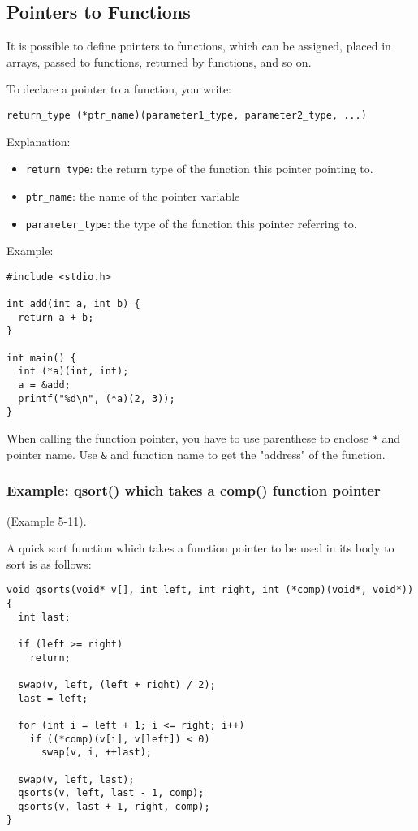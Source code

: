 \documentclass[12pt]{article}
\begin{document}
\subsection{Pointers to Functions}
\label{sec:org058e47b}
It is possible to define pointers to functions, which can be assigned, placed in arrays, passed to functions, returned by functions, and so on.

To declare a pointer to a function, you write:
\begin{verbatim}
return_type (*ptr_name)(parameter1_type, parameter2_type, ...)
\end{verbatim}
Explanation:
\begin{itemize}
\item \texttt{return\_type}: the return type of the function this pointer pointing to.
\item \texttt{ptr\_name}: the name of the pointer variable
\item \texttt{parameter\_type}: the type of the function this pointer referring to.
\end{itemize}

Example:
\begin{verbatim}
#include <stdio.h>

int add(int a, int b) {
  return a + b;
}

int main() {
  int (*a)(int, int);
  a = &add;
  printf("%d\n", (*a)(2, 3));
}
\end{verbatim}
When calling the function pointer, you have to use parenthese to enclose \texttt{*} and pointer name. Use \texttt{\&} and function name to get the "address" of the function.

\subsubsection{Example: qsort() which takes a comp() function pointer}
\label{sec:org483b263}
(Example 5-11).

A quick sort function which takes a function pointer to be used in its body to sort is as follows:
\begin{verbatim}
void qsorts(void* v[], int left, int right, int (*comp)(void*, void*)) {
  int last;

  if (left >= right)
    return;

  swap(v, left, (left + right) / 2);
  last = left;

  for (int i = left + 1; i <= right; i++)
    if ((*comp)(v[i], v[left]) < 0)
      swap(v, i, ++last);

  swap(v, left, last);
  qsorts(v, left, last - 1, comp);
  qsorts(v, last + 1, right, comp);
}
\end{verbatim}
\end{document}
